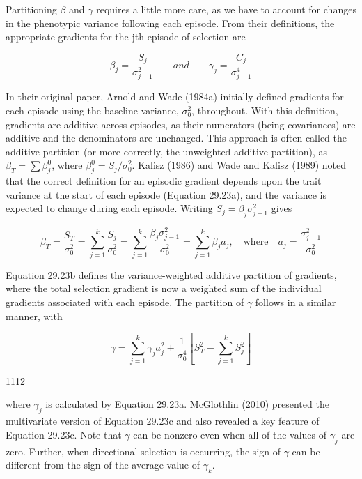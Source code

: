 \documentclass{article}
\begin{document}
Partitioning  $ \beta $ and  $ \gamma $ requires a little more care, as we have to account for changes in the phenotypic variance following each episode. From their definitions, the appropriate gradients for the jth episode of selection are

\begin{equation}
\beta_{j}=\frac{S_{j}}{\sigma_{j-1}^{2}}\qquad and\qquad\gamma_{j}=\frac{C_{j}}{\sigma_{j-1}^{4}}
\tag{29.23a}
\label{eq:29_23a}
\end{equation}

In their original paper, Arnold and Wade (1984a) initially defined gradients for each episode using the baseline variance, $\sigma_0^2$, throughout. With this definition, gradients are additive across episodes, as their numerators (being covariances) are additive and the denominators are unchanged. This approach is often called the additive partition (or more correctly, the unweighted additive partition), as $\beta_T = \sum \beta_j^0$, where $\beta_j^0 = S_j / \sigma_0^2$. Kalisz (1986) and Wade and Kalisz (1989) noted that the correct definition for an episodic gradient depends upon the trait variance at the start of each episode (Equation 29.23a), and the variance is expected to change during each episode. Writing $S_j = \beta_j \sigma_{j-1}^2$ gives

\begin{equation}
\beta_{T}=\frac{S_{T}}{\sigma_{0}^{2}}=\sum_{j=1}^{k}\frac{S_{j}}{\sigma_{0}^{2}}=\sum_{j=1}^{k}\frac{\beta_{j}\sigma_{j-1}^{2}}{\sigma_{0}^{2}}=\sum_{j=1}^{k}\beta_{j}a_{j},\quad\mathrm{w h e r e}\quad a_{j}=\frac{\sigma_{j-1}^{2}}{\sigma_{0}^{2}}
\tag{29.23b}
\label{eq:29_23b}
\end{equation}

Equation 29.23b defines the variance-weighted additive partition of gradients, where the total selection gradient is now a weighted sum of the individual gradients associated with each episode. The partition of  $ \gamma $ follows in a similar manner, with

\begin{equation}
\gamma=\sum_{j=1}^{k}\gamma_{j}a_{j}^{2}+\frac{1}{\sigma_{0}^{4}}\left[S_{T}^{2}-\sum_{j=1}^{k}S_{j}^{2}\right]
\tag{29.23c}
\label{eq:29_23c}
\end{equation}

1112

where  $ \gamma_j $ is calculated by Equation 29.23a. McGlothlin (2010) presented the multivariate version of Equation 29.23c and also revealed a key feature of Equation 29.23c. Note that  $ \gamma $ can be nonzero even when all of the values of  $ \gamma_j $ are zero. Further, when directional selection is occurring, the sign of  $ \gamma $ can be different from the sign of the average value of  $ \gamma_k $.
\end{document}
